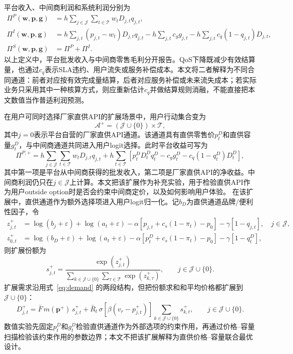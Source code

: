 \documentclass[UTF8,11pt]{ctexart}
\newcommand{\T}{\mathcal{T}}
\newcommand{\J}{\mathcal{J}}
\newcommand{\A}{\mathcal{A}}
\newcommand{\D}{D}
\newcommand{\w}{\boldsymbol{w}}
\newcommand{\p}{\boldsymbol{p}}
\newcommand{\g}{\boldsymbol{g}}
\begin{document}
平台收入、中间商利润和系统利润分别为
\begin{align}
  \Pi^P(\w,\p,\g)
  &=h\sum_{j\in\J}\sum_{t\in\T} w_t\D_{j,t}q_{j,t}, \label{eq:platform_profit}\\
  \Pi^I(\w,\p,\g)
  &=h\sum_{j,t}(p_{j,t}-w_t)\D_{j,t}q_{j,t}
    -h\sum_{j,t}c_g g_{j,t}
    -h\sum_{j,t}c_q(1-q_{j,t})\D_{j,t}, \label{eq:intermediary_profit}\\
  \Pi^S(\w,\p,\g)&=\Pi^P+\Pi^I. \label{eq:system_profit}
\end{align}
以上定义中，平台批发收入与中间商零售毛利分开报告。QoS下降既减少有效结算量，也通过$c_q$表示SLA违约、用户流失或服务补偿成本。本文将二者解释为不同合同通道：前者对应按有效完成量结算，后者对应服务补偿或未来流失成本；若实际业务只采用其中一种核算方式，则应重新估计$c_q$并做结算规则消融，不能直接把本文数值当作普适利润预测。

在用户可同时选择厂家直供API的扩展场景中，用户行动集合变为
\begin{equation}
  \A^+=(\J\cup\{0\})\times\T,
  \label{eq:direct_api_action_set}
\end{equation}
其中$j=0$表示平台自营的厂家直供API通道。该通道具有直供零售价$p^D_t$和直供容量$g^D_t$，与中间商通道共同进入用户logit选择。此时平台收益可写为
\begin{equation}
  \Pi^{P,+}
  =h\sum_{j\in\J}\sum_{t\in\T}w_t\D_{j,t}q_{j,t}
  +h\sum_{t\in\T}\left[
    p^D_t\D^D_tq^D_t-c_g g^D_t-c_q(1-q^D_t)\D^D_t
  \right],
  \label{eq:direct_platform_payoff}
\end{equation}
其中第一项是平台从中间商获得的批发收入，第二项是厂家直供API的净收益。中间商利润仍只在$j\in\J$上计算。本文把该扩展作为补充实验，用于检验直供API作为用户outside option时是否会约束中间商定价，以及如何影响用户体验。
在该扩展中，直供通道作为额外选择项进入用户logit归一化。记$b_D$为直供通道品牌/便利性因子，令
\begin{align}
  z^+_{j,t}
  &=\log(b_j+\varepsilon)+\log(a_t+\varepsilon)
  -\alpha\left[p_{j,t}+c_s(1-\pi_t)-p_0\right]
  -\gamma[1-q_{j,t}],\quad j\in\J, \nonumber\\
  z^+_{0,t}
  &=\log(b_D+\varepsilon)+\log(a_t+\varepsilon)
  -\alpha\left[p^D_t+c_s(1-\pi_t)-p_0\right]
  -\gamma[1-q^D_t],
  \label{eq:direct_api_utility}
\end{align}
则扩展份额为
\begin{equation}
  s^+_{j,t}=
  \frac{\exp(z^+_{j,t})}
  {\sum_{k\in\J\cup\{0\}}\sum_{\tau\in\T}\exp(z^+_{k,\tau})},
  \qquad j\in\J\cup\{0\}.
  \label{eq:direct_api_share}
\end{equation}
扩展需求沿用式~\eqref{eq:demand} 的两段结构，但把份额求和和平均价格都扩展到$\J\cup\{0\}$：
\begin{equation}
  \D^+_{j,t}
  =\bar F\,m(\p^+)\,s^+_{j,t}
  +\bar R_t\,\sigma[\beta(v_r-p^+_{j,t})]
  \sum_{k\in\J\cup\{0\}}s^+_{k,t},
  \qquad j\in\J\cup\{0\}.
  \label{eq:direct_api_demand}
\end{equation}
数值实验先固定$p^D_t$和$g^D_t$检验直供通道作为外部选项的约束作用，再通过价格--容量扫描检验该约束作用的参数边界；本文不把该扩展解释为直供价格--容量联合最优设计。
\end{document}
